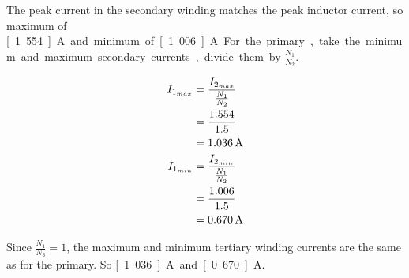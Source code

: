 \subsubsection{}

The peak current in the secondary winding matches the peak inductor current, so maximum of \unit[1.554]{A} and minimum of \unit[1.006]{A}

For the primary, take the minimum and maximum secondary currents, divide them by $\frac{N_1}{N_2}$.

\begin{align*}
I_{1_{max}} & = \frac{I_{2_{max}}}{\frac{N_1}{N_2}} \\
            & = \frac{1.554}{1.5} \\
            & = \unit[1.036]{A} \\
I_{1_{min}} & = \frac{I_{2_{min}}}{\frac{N_1}{N_2}} \\
            & = \frac{1.006}{1.5} \\
            & = \unit[0.670]{A} \\
\end{align*}

Since $\frac{N_1}{N_3}=1$, the maximum and minimum tertiary winding currents are the same as for the primary. So \unit[1.036]{A} and \unit[0.670]{A}.